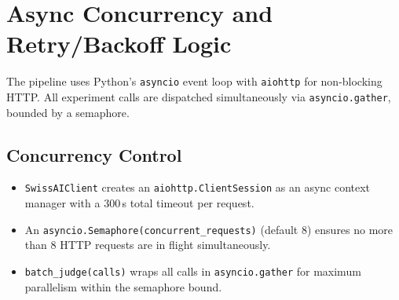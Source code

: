 \documentclass[11pt,a4paper]{article}
\begin{document}
\newpage
\section{Async Concurrency and Retry/Backoff Logic}\label{sec:concurrency}

\begin{conceptbox}
The pipeline uses Python's \texttt{asyncio} event loop with
\texttt{aiohttp} for non-blocking HTTP. All experiment calls are dispatched
simultaneously via \texttt{asyncio.gather}, bounded by a semaphore.
\end{conceptbox}

\subsection{Concurrency Control}

\begin{center}
\end{center}

\begin{itemize}[nosep]
  \item \texttt{SwissAIClient} creates an \texttt{aiohttp.ClientSession} as
    an async context manager with a 300\,s total timeout per request.
  \item An \texttt{asyncio.Semaphore(concurrent\_requests)} (default 8)
    ensures no more than 8 HTTP requests are in flight simultaneously.
  \item \texttt{batch\_judge(calls)} wraps all calls in \texttt{asyncio.gather}
    for maximum parallelism within the semaphore bound.
\end{itemize}
\end{document}
